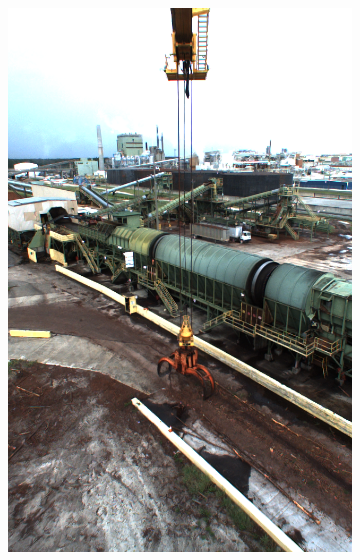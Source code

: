 	\begin{figure}[h]
		\begin{subfigure}[c]{0.24\textwidth}			
			\includegraphics[width=1\textwidth]{bilder/Grundlagen/Daten_Bildqualitaet/gut.png}
		\end{subfigure}
		\begin{subfigure}[c]{0.24\textwidth}			

\end{subfigure}
\end{figure}
